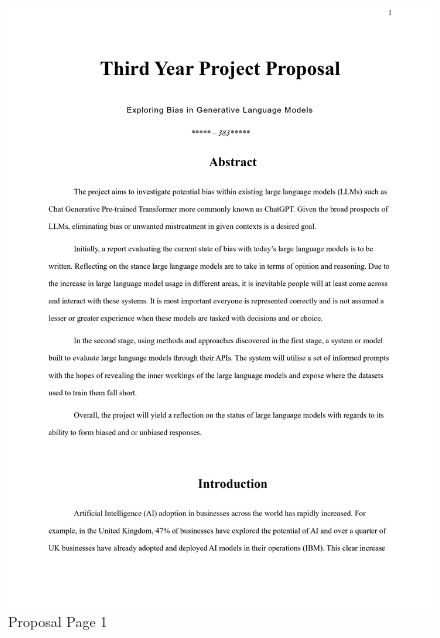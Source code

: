 \documentclass[12pt]{article}
\begin{document}
\begin{figure}[H]
    \centering
    \includegraphics[width=0.85\linewidth]{Images/0001.jpg}
    \caption{Proposal Page 1}

\end{figure}
\end{document}
